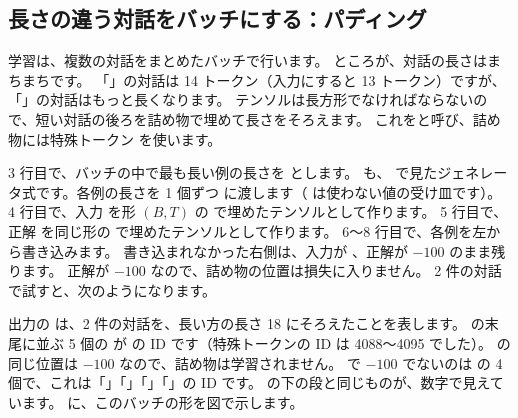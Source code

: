 \subsection{長さの違う対話をバッチにする：パディング}

学習は、複数の対話をまとめたバッチで行います。
ところが、対話の長さはまちまちです。
「」の対話は 14 トークン（入力にすると 13 トークン）ですが、「」の対話はもっと長くなります。
テンソルは長方形でなければならないので、短い対話の後ろを詰め物で埋めて長さをそろえます。
これをと呼び、詰め物には特殊トークン  を使います。


3 行目で、バッチの中で最も長い例の長さを  とします。
 も、 で見たジェネレータ式です。各例の長さを 1 個ずつ  に渡します（\code{_} は使わない値の受け皿です）。
4 行目で、入力  を形 $(B, T)$ の  で埋めたテンソルとして作ります。
5 行目で、正解  を同じ形の  で埋めたテンソルとして作ります。
6〜8 行目で、各例を左から書き込みます。
書き込まれなかった右側は、入力が 、正解が $-100$ のまま残ります。
正解が $-100$ なので、詰め物の位置は損失に入りません。
2 件の対話で試すと、次のようになります。



出力の  は、2 件の対話を、長い方の長さ 18 にそろえたことを表します。
 の末尾に並ぶ 5 個の  が  の ID です（特殊トークンの ID は 4088〜4095 でした）。
 の同じ位置は $-100$ なので、詰め物は学習されません。
 で $-100$ でないのは  の 4 個で、これは「」「」「」「」の ID です。
の下の段と同じものが、数字で見えています。
に、このバッチの形を図で示します。

